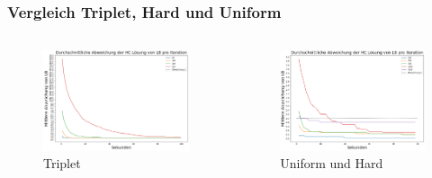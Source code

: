 \documentclass{beamer}
\begin{document}
\begin{frame}
\frametitle{Vergleich Triplet, Hard und Uniform}


\begin{columns}[c] %

\begin{figure}[!htbp]
\includegraphics[scale=0.2]{img/triplet_time.png}
\caption{Triplet}
\label{fig:architecture}
\end{figure}


\begin{figure}[!htbp]
\includegraphics[scale=0.2]{img/uniform_time.png}
\caption{Uniform und Hard}
\label{fig:architecture}
\end{figure}


\end{columns}
\end{frame}
\end{document}
